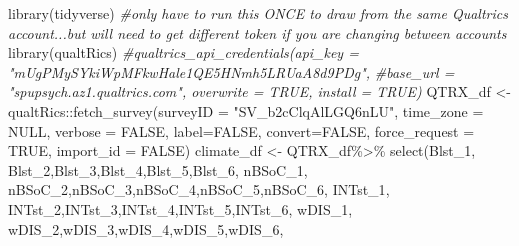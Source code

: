 \documentclass[
  english,
]{book}
\newenvironment{Shaded}{\begin{snugshade}}{\end{snugshade}}
\newcommand{\AttributeTok}[1]{\textcolor[rgb]{0.77,0.63,0.00}{#1}}
\newcommand{\CommentTok}[1]{\textcolor[rgb]{0.56,0.35,0.01}{\textit{#1}}}
\newcommand{\ConstantTok}[1]{\textcolor[rgb]{0.00,0.00,0.00}{#1}}
\newcommand{\FunctionTok}[1]{\textcolor[rgb]{0.00,0.00,0.00}{#1}}
\newcommand{\NormalTok}[1]{#1}
\newcommand{\OtherTok}[1]{\textcolor[rgb]{0.56,0.35,0.01}{#1}}
\newcommand{\SpecialCharTok}[1]{\textcolor[rgb]{0.00,0.00,0.00}{#1}}
\newcommand{\StringTok}[1]{\textcolor[rgb]{0.31,0.60,0.02}{#1}}
\begin{document}
\begin{Shaded}
\begin{Highlighting}[]
\FunctionTok{library}\NormalTok{(tidyverse)}
\CommentTok{\#only have to run this ONCE to draw from the same Qualtrics account...but will need to get different token if you are changing between accounts }
\FunctionTok{library}\NormalTok{(qualtRics)}
\CommentTok{\#qualtrics\_api\_credentials(api\_key = "mUgPMySYkiWpMFkwHale1QE5HNmh5LRUaA8d9PDg",}
              \CommentTok{\#base\_url = "spupsych.az1.qualtrics.com", overwrite = TRUE, install = TRUE)}
\NormalTok{QTRX\_df }\OtherTok{\textless{}{-}}\NormalTok{qualtRics}\SpecialCharTok{::}\FunctionTok{fetch\_survey}\NormalTok{(}\AttributeTok{surveyID =} \StringTok{"SV\_b2cClqAlLGQ6nLU"}\NormalTok{, }\AttributeTok{time\_zone =} \ConstantTok{NULL}\NormalTok{, }\AttributeTok{verbose =} \ConstantTok{FALSE}\NormalTok{, }\AttributeTok{label=}\ConstantTok{FALSE}\NormalTok{, }\AttributeTok{convert=}\ConstantTok{FALSE}\NormalTok{, }\AttributeTok{force\_request =} \ConstantTok{TRUE}\NormalTok{, }\AttributeTok{import\_id =} \ConstantTok{FALSE}\NormalTok{)}
\NormalTok{climate\_df }\OtherTok{\textless{}{-}}\NormalTok{ QTRX\_df}\SpecialCharTok{\%\textgreater{}\%}
  \FunctionTok{select}\NormalTok{(}\StringTok{\textquotesingle{}Blst\_1\textquotesingle{}}\NormalTok{, }\StringTok{\textquotesingle{}Blst\_2\textquotesingle{}}\NormalTok{,}\StringTok{\textquotesingle{}Blst\_3\textquotesingle{}}\NormalTok{,}\StringTok{\textquotesingle{}Blst\_4\textquotesingle{}}\NormalTok{,}\StringTok{\textquotesingle{}Blst\_5\textquotesingle{}}\NormalTok{,}\StringTok{\textquotesingle{}Blst\_6\textquotesingle{}}\NormalTok{,}
         \StringTok{\textquotesingle{}nBSoC\_1\textquotesingle{}}\NormalTok{, }\StringTok{\textquotesingle{}nBSoC\_2\textquotesingle{}}\NormalTok{,}\StringTok{\textquotesingle{}nBSoC\_3\textquotesingle{}}\NormalTok{,}\StringTok{\textquotesingle{}nBSoC\_4\textquotesingle{}}\NormalTok{,}\StringTok{\textquotesingle{}nBSoC\_5\textquotesingle{}}\NormalTok{,}\StringTok{\textquotesingle{}nBSoC\_6\textquotesingle{}}\NormalTok{,}
         \StringTok{\textquotesingle{}INTst\_1\textquotesingle{}}\NormalTok{, }\StringTok{\textquotesingle{}INTst\_2\textquotesingle{}}\NormalTok{,}\StringTok{\textquotesingle{}INTst\_3\textquotesingle{}}\NormalTok{,}\StringTok{\textquotesingle{}INTst\_4\textquotesingle{}}\NormalTok{,}\StringTok{\textquotesingle{}INTst\_5\textquotesingle{}}\NormalTok{,}\StringTok{\textquotesingle{}INTst\_6\textquotesingle{}}\NormalTok{,}
         \StringTok{\textquotesingle{}wDIS\_1\textquotesingle{}}\NormalTok{, }\StringTok{\textquotesingle{}wDIS\_2\textquotesingle{}}\NormalTok{,}\StringTok{\textquotesingle{}wDIS\_3\textquotesingle{}}\NormalTok{,}\StringTok{\textquotesingle{}wDIS\_4\textquotesingle{}}\NormalTok{,}\StringTok{\textquotesingle{}wDIS\_5\textquotesingle{}}\NormalTok{,}\StringTok{\textquotesingle{}wDIS\_6\textquotesingle{}}\NormalTok{,}

\end{Highlighting}
\end{Shaded}
\end{document}
